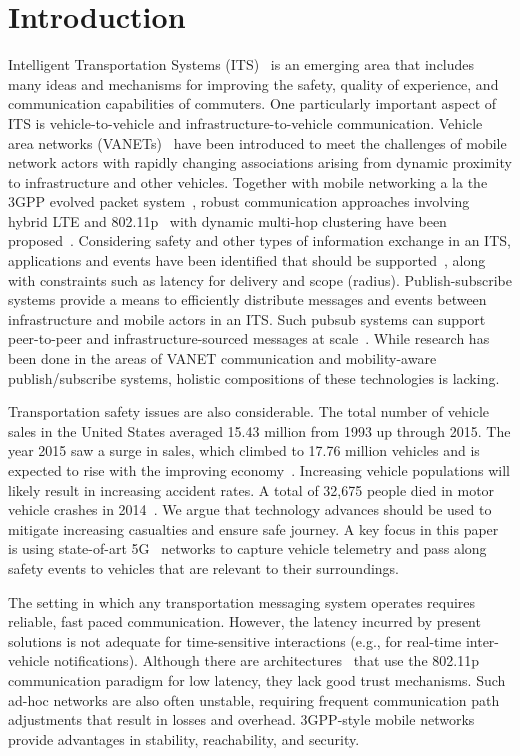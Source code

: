 \section{Introduction}

Intelligent Transportation Systems (ITS)~\cite{zhang2011data} is an emerging
area that includes many ideas and mechanisms for improving the safety,
quality of experience, and communication capabilities of
commuters. One particularly important aspect of ITS is
vehicle-to-vehicle and infrastructure-to-vehicle
communication. Vehicle area networks (VANETs)~\cite{hartenstein2008tutorial} have been
introduced to meet the challenges of mobile network actors with
rapidly changing associations arising from dynamic proximity to
infrastructure and other vehicles. Together with mobile networking a
la the 3GPP evolved packet system~\cite{4G}, robust communication
approaches involving hybrid LTE and 802.11p~\cite{802.11p} with
dynamic multi-hop clustering have been
proposed~\cite{ucar2016multihop,wolny2008modified,zhang2011novel}.
Considering safety and
other types of information exchange in an ITS, applications and events
have been identified that should be supported~\cite{camp2005vehicle,papadimitratos2009vehicular}, along
with constraints such as latency for delivery and scope
(radius). Publish-subscribe systems provide a means to efficiently
distribute messages and events between infrastructure and mobile
actors in an ITS. Such pubsub systems can support peer-to-peer and
infrastructure-sourced messages at scale~\cite{nasim2014mobile}.  While
research has been done in the areas of VANET communication and
mobility-aware publish/subscribe systems, holistic compositions of
these technologies is lacking.

Transportation safety issues are also considerable.  The total number
of vehicle sales in the United States averaged 15.43 million from 1993
up through 2015. The year 2015 saw a surge in sales, which climbed to
17.76 million vehicles and is expected to rise with the improving
economy~\cite{tradingeconomics}. Increasing vehicle populations will likely result
in increasing accident rates. A total of 32,675 people died in motor
vehicle crashes in 2014~\cite{iihs}. We argue that technology advances
should be used to mitigate increasing casualties and ensure safe
journey. A key focus in this paper is using state-of-art
5G~\cite{5gvision} networks to capture vehicle telemetry and pass
along safety events to vehicles that are relevant to their
surroundings.

The setting in which any transportation messaging system operates
requires reliable, fast paced communication. However, the latency
incurred by present solutions is not adequate for time-sensitive
interactions (e.g., for real-time inter-vehicle
notifications). Although there are architectures~\cite{ucar2016multihop} that use
the 802.11p communication paradigm for low latency, they lack good
trust mechanisms. Such ad-hoc networks are also often unstable,
requiring frequent communication path adjustments that result in
losses and overhead. 3GPP-style mobile networks provide advantages in
stability, reachability, and security.

